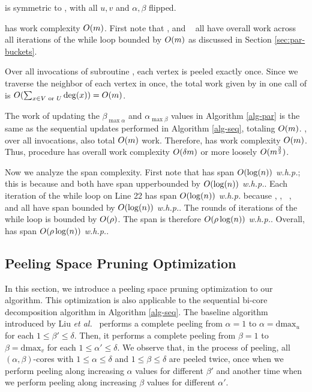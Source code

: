  is symmetric to , with all $u,v$ and $\alpha,\beta$ flipped.

 has work complexity $O(m)$. First note that , and ~\cite{DhBlSh17} all have overall work across all iterations of the while loop bounded by $O(m)$ as discussed in Section \ref{sec:par-buckets}.

Over all invocations of subroutine , each vertex is peeled exactly once. Since we traverse the neighbor of each vertex in  once, the total work given by  in one call of  is $O(\sum_{x\in {V\text{ or }U}} \deg(x))=O(m)$.

The work of updating the $\beta_{\max \alpha}$ and $\alpha_{\max \beta}$ values in Algorithm \ref{alg-par} is the same as the sequential updates performed in Algorithm \ref{alg-seq}, totaling $O(m)$. , over all invocations, also total $O(m)$ work. Therefore,  has work complexity $O(m)$. Thus, procedure  has overall work complexity $O(\delta m)$ or more loosely $O(m^\frac{3}{2})$.

Now we analyze the span complexity. 
First note that  has span $O(\log(n))$ \textit{w.h.p.}; this is because  and  both have span upperbounded by $O(\log(n))$ \textit{w.h.p.}.  
Each iteration of the while loop on Line 22 has span $O(\log(n))$ \textit{w.h.p.} because , , ~\cite{DhBlSh17}, and  all have span bounded by $O(\log(n))$ \textit{w.h.p.}. The rounds of iterations of the while loop is bounded by $O(\rho)$. The span is therefore $O(\rho\log(n))$ \textit{w.h.p.}. Overall,  has span $O(\rho \log(n))$ \textit{w.h.p.}.



\subsection{Peeling Space Pruning Optimization}\label{sec:optim}
In this section, we introduce a peeling space pruning optimization to our algorithm. This optimization is also applicable to the sequential bi-core decomposition algorithm in Algorithm \ref{alg-seq}. The baseline algorithm introduced by Liu \textit{et al.}~\cite{Liu2020Efficient} performs a complete peeling from $\alpha=1$ to $\alpha=\text{dmax}_u$ for each $1\le \beta'\le \delta$. Then, it performs a complete peeling from $\beta=1$ to $\beta=\text{dmax}_v$ for each $1\le \alpha'\le \delta$.
We observe that, in the process of peeling, all $(\alpha,\beta)$-cores with $1\le\alpha\le \delta$ and $1\le\beta\le\delta$ are peeled twice, once when we perform peeling along increasing $\alpha$ values for different $\beta'$ and another time when we perform peeling along increasing $\beta$ values for different $\alpha'$. 

